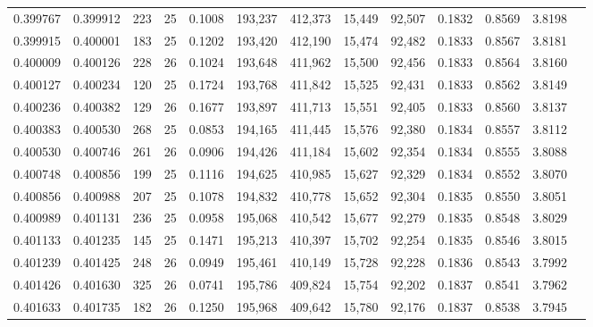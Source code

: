 \begin{tabular}{rrrrrrrrrrrrr}
0.399767 & 0.399912 & 223 &  25 &                                     0.1008 & 193,237 & 412,373 &  15,449 &  92,507 & 0.1832 & 0.8569 & 3.8198 \\
0.399915 & 0.400001 & 183 &  25 &                                     0.1202 & 193,420 & 412,190 &  15,474 &  92,482 & 0.1833 & 0.8567 & 3.8181 \\
0.400009 & 0.400126 & 228 &  26 &                                     0.1024 & 193,648 & 411,962 &  15,500 &  92,456 & 0.1833 & 0.8564 & 3.8160 \\
0.400127 & 0.400234 & 120 &  25 &                                     0.1724 & 193,768 & 411,842 &  15,525 &  92,431 & 0.1833 & 0.8562 & 3.8149 \\
0.400236 & 0.400382 & 129 &  26 &                                     0.1677 & 193,897 & 411,713 &  15,551 &  92,405 & 0.1833 & 0.8560 & 3.8137 \\
0.400383 & 0.400530 & 268 &  25 &                                     0.0853 & 194,165 & 411,445 &  15,576 &  92,380 & 0.1834 & 0.8557 & 3.8112 \\
0.400530 & 0.400746 & 261 &  26 &                                     0.0906 & 194,426 & 411,184 &  15,602 &  92,354 & 0.1834 & 0.8555 & 3.8088 \\
0.400748 & 0.400856 & 199 &  25 &                                     0.1116 & 194,625 & 410,985 &  15,627 &  92,329 & 0.1834 & 0.8552 & 3.8070 \\
0.400856 & 0.400988 & 207 &  25 &                                     0.1078 & 194,832 & 410,778 &  15,652 &  92,304 & 0.1835 & 0.8550 & 3.8051 \\
0.400989 & 0.401131 & 236 &  25 &                                     0.0958 & 195,068 & 410,542 &  15,677 &  92,279 & 0.1835 & 0.8548 & 3.8029 \\
0.401133 & 0.401235 & 145 &  25 &                                     0.1471 & 195,213 & 410,397 &  15,702 &  92,254 & 0.1835 & 0.8546 & 3.8015 \\
0.401239 & 0.401425 & 248 &  26 &                                     0.0949 & 195,461 & 410,149 &  15,728 &  92,228 & 0.1836 & 0.8543 & 3.7992 \\
0.401426 & 0.401630 & 325 &  26 &                                     0.0741 & 195,786 & 409,824 &  15,754 &  92,202 & 0.1837 & 0.8541 & 3.7962 \\
0.401633 & 0.401735 & 182 &  26 &                                     0.1250 & 195,968 & 409,642 &  15,780 &  92,176 & 0.1837 & 0.8538 & 3.7945 \\

\end{tabular}
